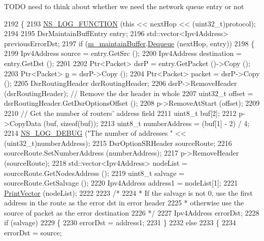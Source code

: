 T\+O\+DO need to think about whether we need the network queue entry or not 
\begin{DoxyCode}
2192 \{
2193   \hyperlink{log-macros-disabled_8h_a90b90d5bad1f39cb1b64923ea94c0761}{NS\_LOG\_FUNCTION} (\textcolor{keyword}{this} << nextHop << (uint32\_t)protocol);
2194 
2195   DsrMaintainBuffEntry entry;
2196   std::vector<Ipv4Address> previousErrorDst;
2197   \textcolor{keywordflow}{if} (\hyperlink{classns3_1_1dsr_1_1DsrRouting_ac9d28a64437fbe20a4228c9811f9fc27}{m\_maintainBuffer}.\hyperlink{classns3_1_1dsr_1_1DsrMaintainBuffer_a0539c5c6c2b05e10f52372f5fdb93c06}{Dequeue} (nextHop, entry))
2198     \{
2199       Ipv4Address source = entry.GetSrc ();
2200       Ipv4Address destination = entry.GetDst ();
2201 
2202       Ptr<Packet> dsrP = entry.GetPacket ()->Copy ();
2203       Ptr<Packet> \hyperlink{lte__link__budget_8m_ac9de518908a968428863f829398a4e62}{p} = dsrP->Copy ();
2204       Ptr<Packet> packet = dsrP->Copy ();
2205       DsrRoutingHeader dsrRoutingHeader;
2206       dsrP->RemoveHeader (dsrRoutingHeader);          \textcolor{comment}{// Remove the dsr header in whole}
2207       uint32\_t offset = dsrRoutingHeader.GetDsrOptionsOffset ();
2208       p->RemoveAtStart (offset);
2209 
2210       \textcolor{comment}{// Get the number of routers' address field}
2211       uint8\_t buf[2];
2212       p->CopyData (buf, \textcolor{keyword}{sizeof}(buf));
2213       uint8\_t numberAddress = (buf[1] - 2) / 4;
2214       \hyperlink{group__logging_ga413f1886406d49f59a6a0a89b77b4d0a}{NS\_LOG\_DEBUG} (\textcolor{stringliteral}{"The number of addresses "} << (uint32\_t)numberAddress);
2215       DsrOptionSRHeader sourceRoute;
2216       sourceRoute.SetNumberAddress (numberAddress);
2217       p->RemoveHeader (sourceRoute);
2218       std::vector<Ipv4Address> nodeList = sourceRoute.GetNodesAddress ();
2219       uint8\_t salvage = sourceRoute.GetSalvage ();
2220       Ipv4Address address1 = nodeList[1];
2221       \hyperlink{classns3_1_1dsr_1_1DsrRouting_a21eda9cea85649375aed0a4b5f0c4c10}{PrintVector} (nodeList);
2222 
2223       \textcolor{comment}{/*}
2224 \textcolor{comment}{       * If the salvage is not 0, use the first address in the route as the error dst in error header}
2225 \textcolor{comment}{       * otherwise use the source of packet as the error destination}
2226 \textcolor{comment}{       */}
2227       Ipv4Address errorDst;
2228       \textcolor{keywordflow}{if} (salvage)
2229         \{
2230           errorDst = address1;
2231         \}
2232       \textcolor{keywordflow}{else}
2233         \{
2234           errorDst = source;

\end{DoxyCode}
